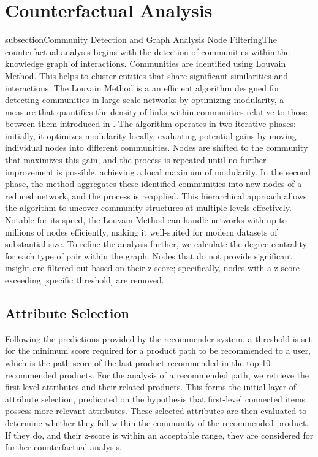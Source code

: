 \section{Counterfactual Analysis}
subsection{Community Detection and Graph Analysis Node Filtering}The counterfactual
analysis begins with the detection of communities within the knowledge graph of interactions.
Communities are identified using Louvain Method. This helps to cluster entities that
share significant similarities and interactions. The Louvain Method is a an
efficient algorithm designed for detecting communities in large-scale networks
by optimizing modularity, a measure that quantifies the density of links within communities
relative to those between them introduced in \parencite{blondel_fast_2008}. The algorithm operates
in two iterative phases: initially, it optimizes modularity locally, evaluating
potential gains by moving individual nodes into different communities. Nodes are
shifted to the community that maximizes this gain, and the process is repeated
until no further improvement is possible, achieving a local maximum of modularity.
In the second phase, the method aggregates these identified communities into new
nodes of a reduced network, and the process is reapplied. This hierarchical approach
allows the algorithm to uncover community structures at multiple levels effectively.
Notable for its speed, the Louvain Method can handle networks with up to millions
of nodes efficiently, making it well-suited for modern datasets of substantial
size. To refine the analysis further, we calculate the degree centrality for
each type of pair within the graph. Nodes that do not provide significant insight
are filtered out based on their z-score; specifically, nodes with a z-score exceeding
[specific threshold] are removed.

\subsection{Attribute Selection}
Following the predictions provided by the recommender system, a threshold is set
for the minimum score required for a product path to be recommended to a user, which
is the path score of the last product recommended in the top 10 recommended products.
For the analysis of a recommended path, we retrieve the first-level attributes and
their related products. This forms the initial layer of attribute selection, predicated
on the hypothesis that first-level connected items possess more relevant attributes.
These selected attributes are then evaluated to determine whether they fall
within the community of the recommended product. If they do, and their z-score
is within an acceptable range, they are considered for further counterfactual analysis.

